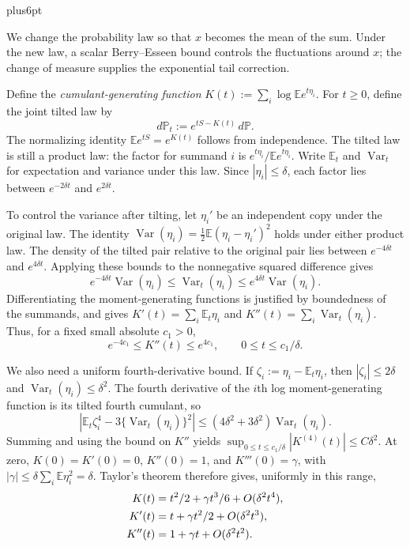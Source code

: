\documentclass[11pt,letterpaper,twoside,leqno]{article}
\makeatletter
\theoremstyle{bookplain}
\theoremstyle{bookremark}
\renewenvironment{proof}[1][\proofname]{\par
  \pushQED{\qed}\normalfont\topsep6pt plus6pt\relax
  \trivlist\item[\hskip\labelsep\bfseries #1\@addpunct{.}]\ignorespaces
}{\popQED\endtrivlist\@endpefalse}
\newcommand{\E}{\mathbb E}
\newcommand{\Pp}{\mathbb P}
\newcommand{\Var}{\operatorname{Var}}
\makeatother
\begin{document}
\begin{proof}
We change the probability law so that $x$ becomes the mean of the
sum. Under the new law, a scalar Berry--Esseen bound controls the
fluctuations around $x$; the change of measure supplies the
exponential tail correction.

Define the \emph{cumulant-generating function}
$K(t):=\sum_i\log\E e^{t\eta_i}$. For $t\ge0$, define the
joint tilted law by
\[
 d\Pp_t:=e^{tS-K(t)}\,d\Pp.
\]
The normalizing identity $\E e^{tS}=e^{K(t)}$ follows from
independence. The tilted law is still a product law: the factor
for summand $i$ is
$e^{t\eta_i}/\E e^{t\eta_i}$. Write $\E_t$ and $\Var_t$
for expectation and variance under this law. Since
$|\eta_i|\le\delta$, each factor lies between
$e^{-2\delta t}$ and $e^{2\delta t}$.

To control the variance after tilting, let $\eta_i'$ be an
independent copy under the original law. The identity
$\Var(\eta_i)=\tfrac12\E(\eta_i-\eta_i')^2$ holds under
either product law. The density of the tilted pair relative to
the original pair lies between $e^{-4\delta t}$ and
$e^{4\delta t}$. Applying these bounds to the nonnegative
squared difference gives
\[
 e^{-4\delta t}\Var(\eta_i)
 \le\Var_t(\eta_i)\le e^{4\delta t}\Var(\eta_i).
\]
Differentiating the moment-generating functions is justified by
boundedness of the summands, and gives
$K'(t)=\sum_i\E_t\eta_i$ and
$K''(t)=\sum_i\Var_t(\eta_i)$. Thus, for a fixed small
absolute $c_1>0$,
\[
 e^{-4c_1}\le K''(t)\le e^{4c_1},\qquad
 0\le t\le c_1/\delta.
\]

We also need a uniform fourth-derivative bound. If
$\zeta_i:=\eta_i-\E_t\eta_i$, then $|\zeta_i|\le2\delta$
and $\Var_t(\eta_i)\le\delta^2$. The fourth derivative of
the $i$th log moment-generating function is its tilted fourth
cumulant, so
\[
 \left|\E_t\zeta_i^4-3\{\Var_t(\eta_i)\}^2\right|
 \le(4\delta^2+3\delta^2)\Var_t(\eta_i).
\]
Summing and using the bound on $K''$ yields
$\sup_{0\le t\le c_1/\delta}|K^{(4)}(t)|\le C\delta^2$.
At zero, $K(0)=K'(0)=0$, $K''(0)=1$, and $K'''(0)=\gamma$,
with $|\gamma|\le\delta\sum_i\E\eta_i^2=\delta$.
Taylor's theorem therefore gives, uniformly in this range,
\begin{align}
 K(t)&=t^2/2+\gamma t^3/6+O(\delta^2t^4),\notag\\
 K'(t)&=t+\gamma t^2/2+O(\delta^2t^3),\notag\\
 K''(t)&=1+\gamma t+O(\delta^2t^2).
 \label{opt:cumulant-expansions}
\end{align}


\end{proof}
\end{document}

